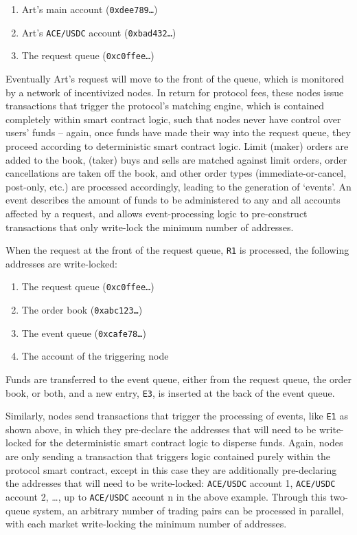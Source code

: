 \documentclass{scrartcl}
\begin{document}
\begin{enumerate}
    \item Art's main account (\texttt{0xdee789\ldots})
    \item Art's \texttt{ACE/USDC} account (\texttt{0xbad432\ldots})
    \item The request queue (\texttt{0xc0ffee\ldots})
\end{enumerate}

Eventually Art's request will move to the front of the queue, which is monitored by a network of incentivized nodes.
In return for protocol fees, these nodes issue transactions that trigger the protocol's matching engine, which is contained completely within smart contract logic, such that nodes never have control over users' funds -- again, once funds have made their way into the request queue, they proceed according to deterministic smart contract logic.
Limit (maker) orders are added to the book, (taker) buys and sells are matched against limit orders, order cancellations are taken off the book, and other order types (immediate-or-cancel, post-only, etc.) are processed accordingly, leading to the generation of `events'.
An event describes the amount of funds to be administered to any and all accounts affected by a request, and allows event-processing logic to pre-construct transactions that only write-lock the minimum number of addresses.

When the request at the front of the request queue, \texttt{R1} is processed, the following addresses are write-locked:

\begin{enumerate}
    \item The request queue (\texttt{0xc0ffee\ldots})
    \item The order book (\texttt{0xabc123\ldots})
    \item The event queue (\texttt{0xcafe78\ldots})
    \item The account of the triggering node
\end{enumerate}

Funds are transferred to the event queue, either from the request queue, the order book, or both, and a new entry, \texttt{E3}, is inserted at the back of the event queue.

Similarly, nodes send transactions that trigger the processing of events, like \texttt{E1} as shown above, in which they pre-declare the addresses that will need to be write-locked for the deterministic smart contract logic to disperse funds.
Again, nodes are only sending a transaction that triggers logic contained purely within the protocol smart contract, except in this case they are additionally pre-declaring the addresses that will need to be write-locked:
\texttt{ACE/USDC} account 1, \texttt{ACE/USDC} account 2, \ldots, up to \texttt{ACE/USDC} account n in the above example.
Through this two-queue system, an arbitrary number of trading pairs can be processed in parallel, with each market write-locking the minimum number of addresses.
\end{document}
